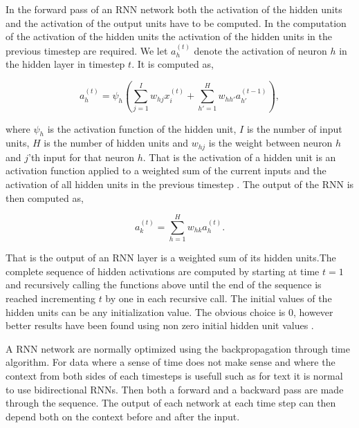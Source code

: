 \begin{description}
        In the forward pass of an \gls{RNN} network both the activation of the
        hidden units and the activation of the output units have to be computed.
        In the computation of the activation of the hidden units the activation
        of the hidden units in the previous timestep are required. We let
        $a^{(t)}_h$ denote the activation of neuron $h$ in the hidden layer in
        timestep $t$. It is computed as,

        \begin{equation}
            a^{(t)}_h = \psi_h\left(
                \sum_{j=1}^I w_{hj} x^{(t)}_i +
                \sum_{h'=1}^H w_{hh'} a^{(t-1)}_{h'}
            \right),
        \end{equation}

        where $\psi_h$ is the activation function of the hidden unit, $I$ is the
        number of input units, $H$ is the number of hidden units and $w_{hj}$ is
        the weight between neuron $h$ and $j$'th input for that neuron $h$. That
        is the activation of a hidden unit is an activation function applied
        to a weighted sum of the current inputs and the activation of all hidden
        units in the previous timestep \citep{DBLP:series/sci/2012-385}. The
        output of the \gls{RNN} is then computed as,

        \begin{equation}
            a^{(t)}_k = \sum_{h=1}^H w_{hk} a_{h}^{(t)}.
        \end{equation}

        That is the output of an \gls{RNN} layer is a weighted sum of its
        hidden units.The complete sequence of hidden activations are computed
        by starting at time $t=1$ and recursively calling the functions above
        until the end of the sequence is reached incrementing $t$ by one in
        each recursive call. The initial values of the hidden units can be
        any initialization value. The obvious choice is 0, however better
        results have been found using non zero initial hidden unit values
        \citep{DBLP:series/sci/2012-385}.

        A \gls{RNN} network are normally optimized using the backpropagation
        through time algorithm. For data where a sense of time does not make
        sense and where the context from both sides of each timesteps is usefull
        such as for text it is normal to use bidirectional \glspl{RNN}. Then
        both a forward and a backward pass are made through the sequence. The
        output of each network at each time step can then depend both on the
        context before and after the input.


\end{description}
